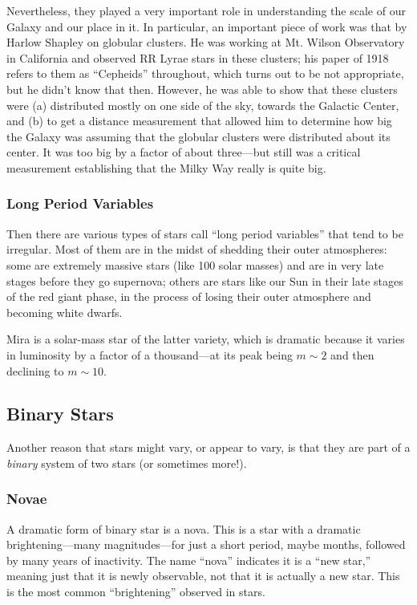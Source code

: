 \documentclass[12pt, preprint]{aastex}
\begin{document}
Nevertheless, they played a very important role in understanding the
scale of our Galaxy and our place in it. In particular, an important
piece of work was that by Harlow Shapley on globular clusters. He was
working at Mt. Wilson Observatory in California and observed RR Lyrae
stars in these clusters; his paper of 1918 refers to them as
``Cepheids'' throughout, which turns out to be not appropriate, but he
didn't know that then. However, he was able to show that these
clusters were (a) distributed mostly on one side of the sky, towards
the Galactic Center, and (b) to get a distance measurement that
allowed him to determine how big the Galaxy was assuming that the
globular clusters were distributed about its center. It was too big by
a factor of about three---but still was a critical measurement
establishing that the Milky Way really is quite big.

\subsubsection{Long Period Variables}

Then there are various types of stars call ``long period variables''
that tend to be irregular. Most of them are in the midst of shedding
their outer atmospheres: some are extremely massive stars (like 100
solar masses) and are in very late stages before they go supernova;
others are stars like our Sun in their late stages of the red giant
phase, in the process of losing their outer atmosphere and becoming
white dwarfs.

Mira is a solar-mass star of the latter variety, which is dramatic
because it varies in luminosity by a factor of a thousand---at its
peak being $m\sim 2$ and then declining to $m\sim 10$.

\subsection{Binary Stars}

Another reason that stars might vary, or appear to vary, is that they
are part of a {\it binary} system of two stars (or sometimes more!).

\subsubsection{Novae}

A dramatic form of binary star is a nova. This is a star with a
dramatic brightening---many magnitudes---for just a short period,
maybe months, followed by many years of inactivity. The name ``nova''
indicates it is a ``new star,'' meaning just that it is newly
observable, not that it is actually a new star. This is the most
common ``brightening'' observed in stars.
\end{document}
